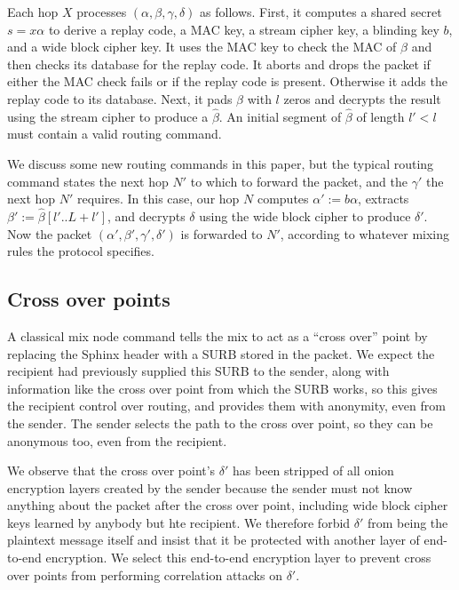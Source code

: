 Each hop $X$ processes $(\alpha,\beta,\gamma,\delta)$ as follows.  
First, it computes a shared secret $s = x \alpha$ to
derive a replay code, a MAC key, a stream cipher key, 
 a blinding key $b$, and a wide block cipher key. 
It uses the MAC key to check the MAC of $\beta$ and
 then checks its database for the replay code.
It aborts and drops the packet if either the MAC check fails or
 if the replay code is present.  Otherwise it adds the replay code
 to its database.
Next, it pads $\beta$ with $l$ zeros and decrypts the result
 using the stream cipher to produce a $\hat\beta$.
An initial segment of $\hat\beta$ of length $l' < l$ must contain
a valid routing command.  

We discuss some new routing commands in this paper, but the typical
routing command states the next hop $N'$ to which to forward the
packet, and the $\gamma'$ the next hop $N'$ requires. 
In this case, our hop $N$ computes $\alpha' := b \alpha$,
extracts $\beta' := \hat\beta[l'..L+l']$, and
decrypts $\delta$ using the wide block cipher to produce $\delta'$.
Now the packet $(\alpha',\beta',\gamma',\delta')$ is forwarded to $N'$,
 according to whatever mixing rules the protocol specifies.


\subsection{Cross over points}\label{subsec:crossover}


A classical mix node command tells the mix to act as a ``cross over''
point by replacing the Sphinx header with a SURB stored in the packet.
We expect the recipient had previously supplied this SURB to the
sender, along with information like the cross over point from which
the SURB works, so this gives the recipient control over routing, 
and provides them with anonymity, even from the sender.  
The sender selects the path to the cross over point, so they can be
anonymous too, even from the recipient.

\smallskip

We observe that the cross over point's $\delta'$ has been stripped of
all onion encryption layers created by the sender because the sender
must not know anything about the packet after the cross over point,
including wide block cipher keys learned by anybody but hte recipient.
We therefore forbid $\delta'$ from being the plaintext message itself
and insist that it be protected with another layer of end-to-end
encryption.  We select this end-to-end encryption layer to prevent
cross over points from performing correlation attacks on $\delta'$.

